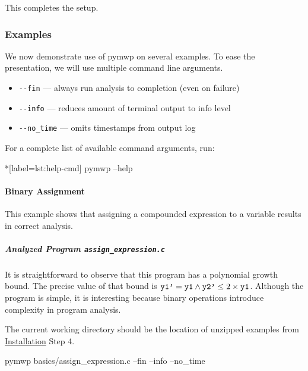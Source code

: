 This completes the setup.

\subsubsection{Examples}\label{guide-examples}

We now demonstrate use of pymwp on several examples.
To ease the presentation, we will use multiple command line arguments.

\begin{itemize}
\item \texttt{-\/-fin} --- always run analysis to completion (even on failure)
\item \texttt{-\/-info} --- reduces amount of terminal output to info level
\item \texttt{-\/-no\_time} --- omits timestamps from output log
\end{itemize}

For a complete list of available command arguments, run:

\begin{cmdlisting}*[label={lst:help-cmd}]
pymwp --help
\end{cmdlisting}

\paragraph{Binary Assignment}\label{binary-assignment}
This example shows that assigning a compounded expression to a variable results in correct analysis.

\subparagraph*{Analyzed Program \texttt{assign\_expression.c}}\mbox{}

\begin{minipage}{\textwidth}

\end{minipage}

It is straightforward to observe that this program has a polynomial growth bound.
The precise value of that bound is \(\prm{y1'} = \prm{y1} \land \prm{y2'} \leq 2 \times \prm{y1}\).
Although the program is simple, it is interesting because binary operations introduce complexity in program analysis.

The current working directory should be the location of unzipped examples from \hyperref[guide-install]{Installation} Step 4.

\begin{cmdlisting}[label={lst:ex1-run}]
pymwp basics/assign_expression.c --fin --info --no_time
\end{cmdlisting}


